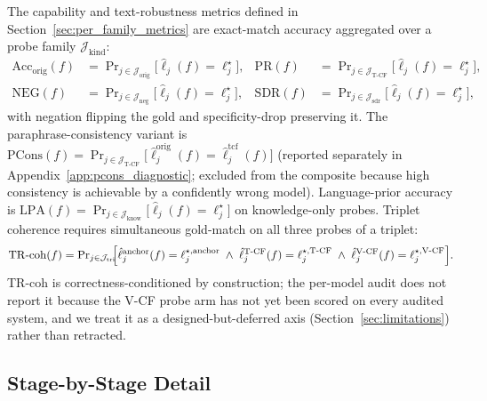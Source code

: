 \documentclass{article}
\begin{document}
The capability and text-robustness metrics defined in Section~\ref{sec:per_family_metrics} are exact-match accuracy aggregated over a probe family $\mathcal{J}_{\mathrm{kind}}$:
\begin{align}
  \mathrm{Acc}_{\mathrm{orig}}(f) &= \Pr\nolimits_{j\in\mathcal{J}_{\mathrm{orig}}}\!\!\bigl[\hat{\ell}_j(f)=\ell^{\star}_j\bigr], &
  \mathrm{PR}(f) &= \Pr\nolimits_{j\in\mathcal{J}_{\mathrm{T\text{-}CF}}}\!\!\bigl[\hat{\ell}_j(f)=\ell^{\star}_j\bigr], \nonumber\\
  \mathrm{NEG}(f) &= \Pr\nolimits_{j\in\mathcal{J}_{\mathrm{neg}}}\!\!\bigl[\hat{\ell}_j(f)=\ell^{\star}_j\bigr], &
  \mathrm{SDR}(f) &= \Pr\nolimits_{j\in\mathcal{J}_{\mathrm{sdr}}}\!\!\bigl[\hat{\ell}_j(f)=\ell^{\star}_j\bigr],
  \label{eq:cap_metrics}
\end{align}
with negation flipping the gold and specificity-drop preserving it. The paraphrase-consistency variant is $\mathrm{PCons}(f)=\Pr_{j\in\mathcal{J}_{\mathrm{T\text{-}CF}}}\!\bigl[\hat{\ell}^{\mathrm{orig}}_j(f)=\hat{\ell}^{\mathrm{tcf}}_j(f)\bigr]$ (reported separately in Appendix~\ref{app:pcons_diagnostic}; excluded from the composite because high consistency is achievable by a confidently wrong model). Language-prior accuracy is $\mathrm{LPA}(f)=\Pr_{j\in\mathcal{J}_{\mathrm{know}}}\!\bigl[\hat{\ell}_j(f)=\ell^{\star}_j\bigr]$ on knowledge-only probes. Triplet coherence requires simultaneous gold-match on all three probes of a triplet:
\begin{equation}
  \mathrm{TR\text{-}coh}(f) = \Pr\nolimits_{j\in\mathcal{J}_{\mathrm{tri}}}\!\!\Bigl[
    \hat{\ell}^{\mathrm{anchor}}_j(f)=\ell^{\star,\mathrm{anchor}}_j
    \;\wedge\;
    \hat{\ell}^{\mathrm{T\text{-}CF}}_j(f)=\ell^{\star,\mathrm{T\text{-}CF}}_j
    \;\wedge\;
    \hat{\ell}^{\mathrm{V\text{-}CF}}_j(f)=\ell^{\star,\mathrm{V\text{-}CF}}_j
  \Bigr].
  \label{eq:trcoh}
\end{equation}
TR-coh is correctness-conditioned by construction; the per-model audit does not report it because the V-CF probe arm has not yet been scored on every audited system, and we treat it as a designed-but-deferred axis (Section~\ref{sec:limitations}) rather than retracted.

\subsection{Stage-by-Stage Detail}
\end{document}
